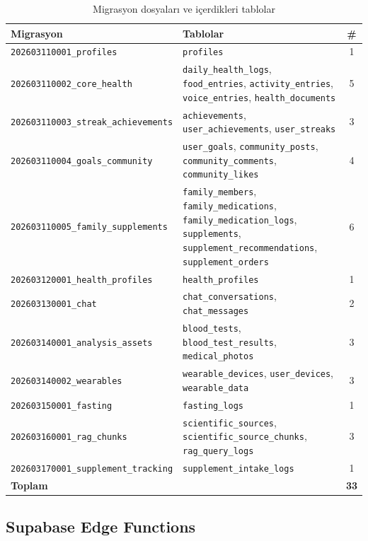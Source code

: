 \begin{table}[H]
\centering
\caption{Migrasyon dosyaları ve içerdikleri tablolar}
\label{tab:tables_full}
\small
\begin{tabular}{|l|p{}|c|}
\hline
\textbf{Migrasyon} & \textbf{Tablolar} & \textbf{\#} \\
\hline
\texttt{202603110001\_profiles}            & \texttt{profiles} & 1 \\
\texttt{202603110002\_core\_health}        & \texttt{daily\_health\_logs}, \texttt{food\_entries}, \texttt{activity\_entries}, \texttt{voice\_entries}, \texttt{health\_documents} & 5 \\
\texttt{202603110003\_streak\_achievements}& \texttt{achievements}, \texttt{user\_achievements}, \texttt{user\_streaks} & 3 \\
\texttt{202603110004\_goals\_community}    & \texttt{user\_goals}, \texttt{community\_posts}, \texttt{community\_comments}, \texttt{community\_likes} & 4 \\
\texttt{202603110005\_family\_supplements} & \texttt{family\_members}, \texttt{family\_medications}, \texttt{family\_medication\_logs}, \texttt{supplements}, \texttt{supplement\_recommendations}, \texttt{supplement\_orders} & 6 \\
\texttt{202603120001\_health\_profiles}    & \texttt{health\_profiles} & 1 \\
\texttt{202603130001\_chat}                & \texttt{chat\_conversations}, \texttt{chat\_messages} & 2 \\
\texttt{202603140001\_analysis\_assets}    & \texttt{blood\_tests}, \texttt{blood\_test\_results}, \texttt{medical\_photos} & 3 \\
\texttt{202603140002\_wearables}           & \texttt{wearable\_devices}, \texttt{user\_devices}, \texttt{wearable\_data} & 3 \\
\texttt{202603150001\_fasting}             & \texttt{fasting\_logs} & 1 \\
\texttt{202603160001\_rag\_chunks}         & \texttt{scientific\_sources}, \texttt{scientific\_source\_chunks}, \texttt{rag\_query\_logs} & 3 \\
\texttt{202603170001\_supplement\_tracking}& \texttt{supplement\_intake\_logs} & 1 \\
\hline
\textbf{Toplam} & & \textbf{33} \\
\hline
\end{tabular}
\end{table}

\subsection{Supabase Edge Functions}


